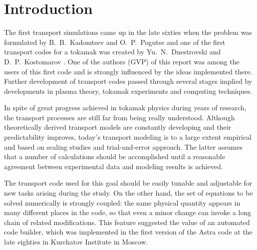 \section{Introduction}

The first transport simulations came up in the late sixties when 
the problem was formulated by B.~B.~Kadomtsev and O.~P.~Pogutse \cite{KP}
and one of the first transport codes for a tokamak was created by
Yu.~N.~Dnestrovski and D.~P.~Kostomarov \cite{DK}. 
One of the authors (GVP) of this report was among the users of this
first code and is strongly influenced by the ideas implemented there. 
Further development of transport codes passed through several stages
implied by developments in plasma theory, tokamak experiments and
computing techniques. 

In spite of great progress achieved in tokamak physics during years of
research, the transport processes are still far from being really
understood. Although theoretically derived transport models are
constantly developing and their predictability improves, today's
transport modeling is to a large extent empirical and based on scaling
studies and trial-and-error approach. 
The latter assumes that a number of calculations should be accomplished
until a reasonable agreement between experimental data and modeling
results is achieved. 

The transport code used for this goal should be easily tunable and
adjustable for new tasks arising during the study.  
On the other hand, the set of equations to be solved numerically is
strongly coupled: the same physical quantity appears in many different
places in the code, so that even a minor change can invoke a long chain
of related modifications.  
This feature suggested the value of an automated code builder, which was
implemented in the first version of the Astra code at the late eighties
in Kurchatov Institute in Moscow. 

